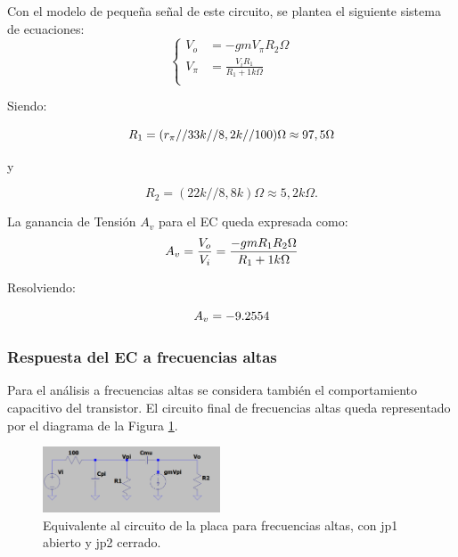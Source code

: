 \documentclass[letterpaper, 10 pt, conference]{ieeeconf}  %
\begin{document}
Con el modelo de pequeña señal de este circuito, se plantea el siguiente sistema de ecuaciones:\\

\begin{equation}
\left\{
\begin{aligned}
V_o &= -gmV_{\pi }R_2\Omega\\ 
V_{\pi} &= \frac{V_iR_1}{R_1 + 1k\Omega}\\
\end{aligned}
\right.
\label{aprox_polos}
\end{equation}

Siendo:

\begin{equation}
    R_1 = (r_{\pi} // 33k // 8,2k // 100) \Omega \approx 97,5\Omega\\
\end{equation}

y

\begin{equation} 
    R_2 = (22k // 8,8k) \Omega \approx 5,2k\Omega.      
\end{equation}

La ganancia de Tensión $A_v$ para el EC queda expresada como:\\
\begin{equation}
A_v = \frac{V_o}{V_i} = \frac{-gmR_1R_2\Omega}{R_1 + 1k\Omega}\\
\end{equation}

Resolviendo:

\begin{equation}
A_v = -9.2554\\
\end{equation}

\subsubsection{Respuesta del EC a frecuencias altas}

Para el análisis a frecuencias altas se considera también el comportamiento capacitivo del transistor. El circuito final de frecuencias altas queda representado por el diagrama de la Figura \ref{fig:ECfreq_altas}.

\begin{figure}[H]
  \centering
  \includegraphics[width=0.47\textwidth]{imagenes/freq altas EC.png}
  \caption{Equivalente al circuito de la placa para frecuencias altas, con jp1 abierto y jp2 cerrado.}
  \label{fig:ECfreq_altas}
\end{figure}
\end{document}
